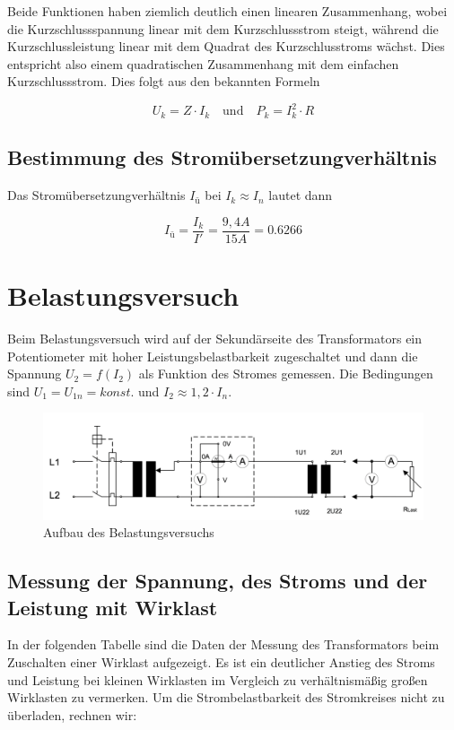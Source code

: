 \documentclass{article}
\begin{document}
Beide Funktionen haben ziemlich deutlich einen linearen Zusammenhang, wobei die Kurzschlussspannung linear mit dem Kurzschlussstrom steigt, während die Kurzschlussleistung linear mit dem Quadrat des Kurzschlusstroms wächst. Dies entspricht also einem quadratischen Zusammenhang mit dem einfachen Kurzschlussstrom. Dies folgt aus den bekannten Formeln

\[
  U_{k} = Z \cdot I_{k} \quad \text{und} \quad P_{k} = I_{k}^{2}\cdot R
\]
\subsection{Bestimmung des Stromübersetzungverhältnis}
Das Stromübersetzungverhältnis $I_{ü}$ bei $I_{k} \approx I_{n}$ lautet dann

\begin{equation*}
  I_{ü} = \frac{I_{k}}{I'} = \frac{9,4A}{15A} = 0.6266
\end{equation*}

\section{Belastungsversuch}
\label{sec:belastungsversuch}

Beim Belastungsversuch wird auf der Sekundärseite des Transformators ein Potentiometer mit hoher Leistungsbelastbarkeit zugeschaltet und dann die Spannung $U_{2} = f(I_{2})$ als Funktion des Stromes gemessen. Die Bedingungen sind $U_{1} = U_{1n} = konst.$ und $I_{2} \approx 1,2 \cdot I_{n}$.
\begin{figure}[h]
  \centering
  \includegraphics[width=\textwidth]{../assets/images/gep3/belastung_aufbau.png}
  \caption{Aufbau des Belastungsversuchs}
  \label{fig:belastaufbau}
\end{figure}
\subsection{Messung der Spannung, des Stroms und der Leistung mit Wirklast}
\label{sec:messung-der-spannung}

In der folgenden Tabelle sind die Daten der Messung des Transformators beim Zuschalten einer Wirklast aufgezeigt. Es ist ein deutlicher Anstieg des Stroms und Leistung bei kleinen Wirklasten im Vergleich zu verhältnismäßig großen Wirklasten zu vermerken. Um die Strombelastbarkeit des Stromkreises nicht zu überladen, rechnen wir:
\end{document}
